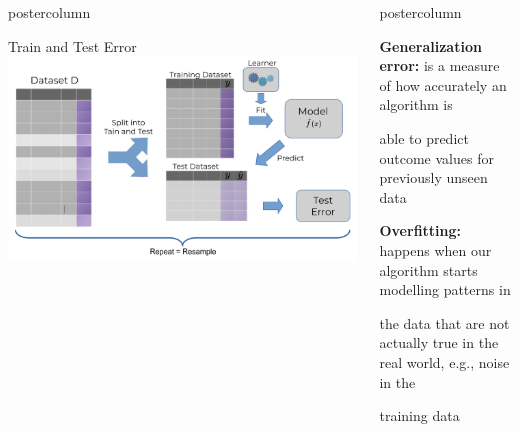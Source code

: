 \documentclass{beamer}
\begin{document}
\begin{frame}[fragile]{}
\begin{columns}
\begin{column}{.31\textwidth}
\begin{beamercolorbox}[center]{postercolumn}
\begin{minipage}{.98\textwidth}
{\begin{myblock}{Train and Test Error}
    \hspace*{1ex}
    \vspace*{1ex}	
    \includegraphics[width=1\columnwidth]{img/test_error.png}
    \end{myblock}
  }
  \end{minipage}
  \end{beamercolorbox}
  \end{column}
  
  \begin{column}{.31\textwidth}
  \begin{beamercolorbox}[center]{postercolumn}
  \begin{minipage}{.98\textwidth}
  \parbox[t][\columnheight]{\textwidth}{
    \begin{myblock}{ }
    \begin{codebox}
    \textbf{Generalization error: }is a measure of how accurately an algorithm is
    \end{codebox}
    
    \begin{codebox}
    able to predict outcome values for previously unseen data
    \end{codebox}
    
    \vspace*{1ex}
    
    \begin{codebox}
    \textbf{Overfitting: }happens when our algorithm starts modelling patterns in
    \end{codebox}
    \begin{codebox}
    the data that are not actually true in the real world, e.g., noise in the
    \end{codebox}
    \begin{codebox}
    training data
    \end{codebox}
    

\end{myblock}}
\end{minipage}
\end{beamercolorbox}
\end{column}
\end{columns}
\end{frame}
\end{document}

